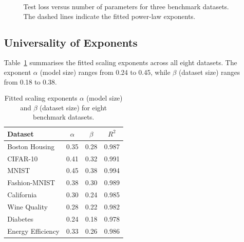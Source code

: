 \documentclass[
    language=english,
    doctype=article,
    institution=none,
    titlestyle=book,
]{../../omnilatex}
\begin{document}
\begin{figure}[htbp]
    \centering
    \caption{Test loss versus number of parameters for three benchmark
    datasets.  The dashed lines indicate the fitted power-law exponents.}
    \label{fig:scaling}
\end{figure}

\subsection{Universality of Exponents}
Table~\ref{tab:exponents} summarises the fitted scaling exponents across all
eight datasets.  The exponent $\alpha$ (model size) ranges from 0.24 to 0.45,
while $\beta$ (dataset size) ranges from 0.18 to 0.38.

\begin{table}[htbp]
    \centering
    \caption{Fitted scaling exponents $\alpha$ (model size) and $\beta$
    (dataset size) for eight benchmark datasets.}
    \label{tab:exponents}
    \begin{tabular}{@{}lccc@{}}
        \toprule
        \textbf{Dataset} & $\alpha$ & $\beta$ & $R^{2}$ \\
        \midrule
        Boston Housing   & 0.35 & 0.28 & 0.987 \\
        CIFAR-10         & 0.41 & 0.32 & 0.991 \\
        MNIST            & 0.45 & 0.38 & 0.994 \\
        Fashion-MNIST    & 0.38 & 0.30 & 0.989 \\
        California       & 0.30 & 0.24 & 0.985 \\
        Wine Quality     & 0.28 & 0.22 & 0.982 \\
        Diabetes         & 0.24 & 0.18 & 0.978 \\
        Energy Efficiency & 0.33 & 0.26 & 0.986 \\
        \bottomrule
    \end{tabular}
\end{table}
\end{document}
